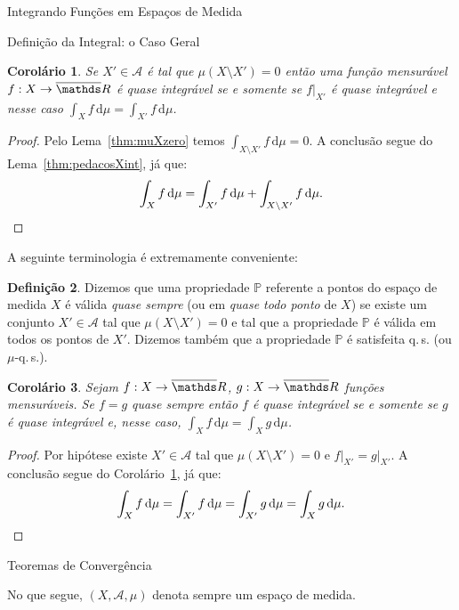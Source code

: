 \documentclass[oneside,final,11pt]{amsbook}
\newcommand{\R}{\mathds R}
\newcommand{\dd}{\mathrm d}
\newcommand{\qs}{\hbox{q.$\,$s.}}
\theoremstyle{remark}\newtheorem{exercise}{Exercício}[chapter]
\theoremstyle{remark}\newtheorem{*exercise}[exercise]{\hbox to 0pt{\hskip 0pt minus 1fil*}Exercício}
\theoremstyle{definition}\newtheorem{exdefin}{Definição}[chapter]
\theoremstyle{plain}\newtheorem{teo}{Teorema}[section]
\theoremstyle{plain}\newtheorem{lem}[teo]{Lema}
\theoremstyle{plain}\newtheorem{prop}[teo]{Proposição}
\theoremstyle{plain}\newtheorem{cor}[teo]{Corolário}
\theoremstyle{definition}\newtheorem{defin}[teo]{Definição}
\theoremstyle{remark}\newtheorem{rem}[teo]{Observação}
\theoremstyle{definition}\newtheorem{notation}[teo]{Notação}
\theoremstyle{definition}\newtheorem{convention}[teo]{Convenção}
\theoremstyle{definition}\newtheorem{example}[teo]{Exemplo}
\numberwithin{section}{chapter}
\numberwithin{equation}{section}
\begin{document}
\begin{chapter}{Integrando Funções em Espaços de Medida}
\begin{section}{Definição da Integral: o Caso Geral}
\begin{cor}\label{thm:corXlinhazero}
Se $X'\in\mathcal A$ é tal que $\mu(X\setminus X')=0$ então uma função mensurável
$f:X\to\overline\R$ é quase integrável se e somente se $f\vert_{X'}$ é quase integrável
e nesse caso $\int_Xf\,\dd\mu=\int_{X'}f\,\dd\mu$.
\end{cor}
\begin{proof}
Pelo Lema~\ref{thm:muXzero} temos $\int_{X\setminus X'}f\,\dd\mu=0$. A conclusão
segue do Lema~\ref{thm:pedacosXint}, já que:
\[\int_Xf\,\dd\mu=\int_{X'}f\,\dd\mu+\int_{X\setminus X'}f\,\dd\mu.\qedhere\]
\end{proof}

A seguinte terminologia é extremamente conveniente:
\begin{defin}
Dizemos que uma propriedade $\mathbb P$ referente a pontos do espaço de medida $X$
é válida {\em quase sempre\/} (ou em {\em quase todo ponto\/} de $X$) se existe um conjunto
$X'\in\mathcal A$ tal que $\mu(X\setminus X')=0$ e tal que a propriedade $\mathbb P$
é válida em todos os pontos de $X'$. Dizemos também que a propriedade $\mathbb P$
é satisfeita \qs\index[indice]{qs@\qs} (ou $\mu$-\qs\index[indice]{mu qs@$\mu$-\qs}).
\end{defin}

\begin{cor}\label{thm:fquaseiggintr}
Sejam $f:X\to\overline\R$, $g:X\to\overline\R$ funções mensuráveis.
Se $f=g$ quase sempre então $f$ é quase integrável se e somente se $g$ é quase integrável
e, nesse caso, $\int_Xf\,\dd\mu=\int_Xg\,\dd\mu$.
\end{cor}
\begin{proof}
Por hipótese existe $X'\in\mathcal A$ tal que $\mu(X\setminus X')=0$ e $f\vert_{X'}=g\vert_{X'}$.
A conclusão segue do Corolário~\ref{thm:corXlinhazero}, já que:
\[\int_Xf\,\dd\mu=\int_{X'}f\,\dd\mu=\int_{X'}g\,\dd\mu=\int_Xg\,\dd\mu.\qedhere\]
\end{proof}

\end{section}

\begin{section}{Teoremas de Convergência}

No que segue, $(X,\mathcal A,\mu)$ denota sempre um espaço de medida.


\end{section}
\end{chapter}
\end{document}
